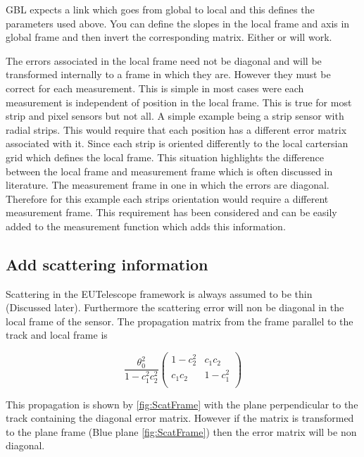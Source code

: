 GBL expects a link which goes from global to local and this defines the parameters used above. You can define the slopes in the local frame and axis in global frame and then invert the corresponding matrix. Either or will work.

The errors associated in the local frame need not be diagonal and will be transformed internally to a frame in which they are. However they must be correct for each measurement. This is simple in most cases were each measurement is independent of position in the local frame. This is true for most strip and pixel sensors but not all. A simple example being a strip sensor with radial strips. This would require that each position has a different error matrix associated with it. Since each strip is oriented differently to the local cartersian grid which defines the local frame. This situation highlights the difference between the local frame and measurement frame which is often discussed in literature. The measurement frame in one in which the errors are diagonal. Therefore for this example each strips orientation would require a different measurement frame. This requirement has been considered and can be easily added to the measurement function which adds this information.



\subsection{Add scattering information}
\label{sec:scat}
Scattering in the EUTelescope framework is always assumed to be thin (Discussed later). Furthermore the scattering error will non be diagonal in the local frame of the sensor. The propagation matrix from the frame parallel to the track and local frame is

\[ 
\frac{\theta_{0}^{2}}{1-c^2_1 c^2_2}
\left(
  \begin{array}{cc}
 1-c^{2}_{2} & c_{1}c_{2}    \\
 c_{1}c_{2} & 1-c^{2}_{1} \\   
\end{array} \right)\] 



This propagation is shown by \ref{fig:ScatFrame} with the plane perpendicular to the track containing the diagonal error matrix. However if the matrix is transformed to the plane frame (Blue plane \ref{fig:ScatFrame}) then the error matrix will be non diagonal.

